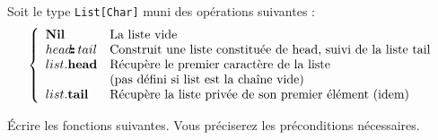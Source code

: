 \documentclass[10pt]{article}\usepackage[correction,nu]{esial}
\begin{document}
\Exercice Soit le type \texttt{List[Char]} muni des opérations suivantes :
$$\left\{
\begin{array}{ll}
  \mathbf{Nil}&\text{La liste vide}\\
  head\text{\textbf{$\!$:$\!$:}}\, tail& \text{Construit une liste constituée de head, suivi de la liste tail}\\
  list\mathbf{.head}& \text{Récupère le premier caractère de la liste}\\
  &\text{(pas défini si list est la chaîne vide)}\\
  list\mathbf{.tail}& \text{Récupère la liste privée de son premier élément (idem)}
\end{array}\right.
$$

\noindent Écrire les fonctions suivantes. Vous préciserez les préconditions
nécessaires.
\end{document}
